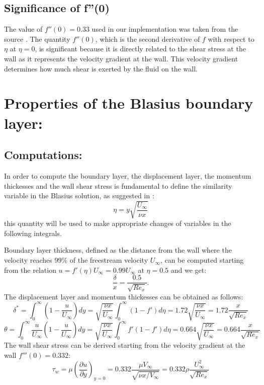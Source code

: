 \documentclass{article}
\begin{document}
\subsection{Significance of f''(0)}
The value of \( f''(0) = 0.33 \) used in our implementation was taken from the source \cite{clarkrichards2022}. The
quantity \( f''(0) \), which is the second derivative of \( f \) with respect to \( \eta \) at \( \eta = 0 \), is significant
because it is directly related to the shear stress at the wall as it represents the velocity gradient at the wall.
This velocity gradient determines how much shear is exerted by the fluid on the wall. 

\section{Properties of the Blasius boundary layer:}

\subsection{Computations:}
In order to compute the boundary layer, the displacement layer, the momentum thickesses and the wall shear stress is fundamental to define the similarity variable in the Blasius solution, as suggested in \cite{Blasius_computations}: 
\[
\eta = y \sqrt{\frac{U_\infty}{\nu x}}
\]
this quantity will be used to make appropriate changes of variables in the following integrals.

Boundary layer thickness, defined as the distance from the wall where the velocity reaches 99\% of the freestream velocity $U_\infty$, can be computed starting from the relation $u = f'(\eta) U_\infty = 0.99 U_\infty$ at $\eta = 0.5$ and we get:
\[
\frac{\delta}{x} = \frac{0.5}{\sqrt{Re_x}}.
\]
The displacement layer and momentum thickesses can be obtained as follows:
\[
\delta^* = \int_0^\infty \left(1 - \frac{u}{U_\infty}\right) dy = \sqrt{\frac{\nu x}{U_\infty}} \int_0^\infty \left(1 - f'\right) d\eta = 1.72 \sqrt{\frac{\nu x}{U_\infty}} = 1.72 \frac{x}{\sqrt{Re_x}}
\]
\[
\theta = \int_0^\infty \frac{u}{U_\infty} \left(1 - \frac{u}{U_\infty}\right) dy = \sqrt{\frac{\nu x}{U_\infty}} \int_0^\infty f'(1 - f') d\eta = 0.664 \sqrt{\frac{\nu x}{U_\infty}} = 0.664 \frac{x}{\sqrt{Re_x}}
\]
The wall shear stress can be derived starting from the velocity gradient at the wall $f'''(0) = 0.332$:
\[
\tau_w = \mu \left( \frac{\partial u}{\partial y} \right)_{y=0} = 0.332 \frac{\mu V_\infty}{\sqrt{\nu x / V_\infty}} = 0.332 \rho \frac{U_\infty^2}{\sqrt{Re_x}}
\]
\end{document}
